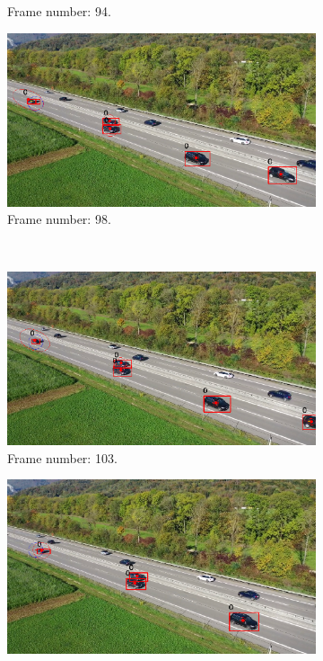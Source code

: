 \begin{figure}[H]
\begin{subfigure}{0.48\textwidth}
        \caption{Frame number: 94.}
        \label{fig:E1-V2-S2:03}
    \end{subfigure}
    \begin{subfigure}{0.48\textwidth}
        \centering
        \includegraphics[width=\linewidth]{../../../experiments/E1/V2/SAM/98}
        \caption{Frame number: 98.}
        \label{fig:E1-V2-S2:04}
    \end{subfigure}
    \\
    \begin{subfigure}{0.48\textwidth}
        \centering
        \includegraphics[width=\linewidth]{../../../experiments/E1/V2/SAM/103}
        \caption{Frame number: 103.}
        \label{fig:E1-V2-S2:05}
    \end{subfigure}
    \begin{subfigure}{0.48\textwidth}
        \centering
        \includegraphics[width=\linewidth]{../../../experiments/E1/V2/SAM/109}

\end{subfigure}
\end{figure}
